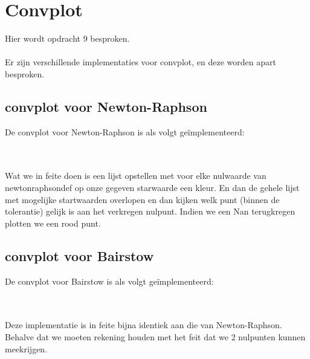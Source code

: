 \documentclass[a4paper,kulak]{kulakarticle}
\begin{document}
\section{Convplot}
Hier wordt opdracht 9 besproken.
\\~\\
Er zijn verschillende implementaties voor convplot, en deze worden apart besproken.
\subsection{convplot voor Newton-Raphson}
De convplot voor Newton-Raphson is als volgt geïmplementeerd:

~\\~\\
Wat we in feite doen is een lijst opstellen met voor elke nulwaarde van newtonraphsondef op onze gegeven starwaarde een kleur. En dan de gehele lijst met mogelijke startwaarden overlopen en dan kijken welk punt (binnen de tolerantie) gelijk is aan het verkregen nulpunt. Indien we een Nan terugkregen plotten we een rood punt.
\subsection{convplot voor Bairstow}
De convplot voor Bairstow is als volgt geïmplementeerd:

~\\~\\
Deze implementatie is in feite bijna identiek aan die van Newton-Raphson. Behalve dat we moeten rekening houden met het feit dat we 2 nulpunten kunnen meekrijgen.
\end{document}
